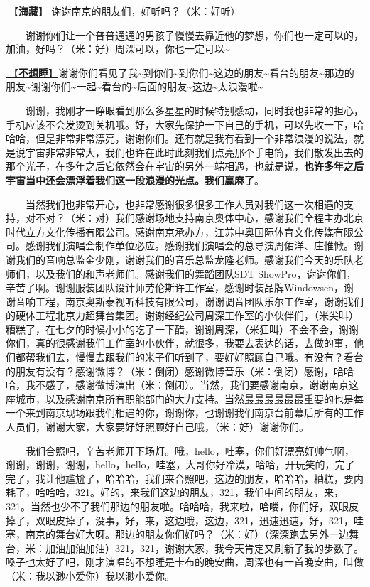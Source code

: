 \documentclass[]{ctexbook}
\begin{document}
\hyperref[ocean-treasure]{🎵【\textbf{海藏}】} 谢谢南京的朋友们，好听吗？（米：好听）

  谢谢你们让一个普普通通的男孩子慢慢去靠近他的梦想，你们也一定可以的，加油，好吗？（米：好）周深可以，你也一定可以\textasciitilde{}

\hyperref[keep-playing]{🎵【\textbf{不想睡}】}谢谢你们看见了我\textasciitilde 到你们\textasciitilde 到你们\textasciitilde 这边的朋友\textasciitilde 看台的朋友\textasciitilde 那边的朋友\textasciitilde 谢谢你们\textasciitilde 一起\textasciitilde 看台的\textasciitilde 后面的朋友\textasciitilde 这边\textasciitilde 太浪漫啦\textasciitilde{}

  谢谢，我刚才一睁眼看到那么多星星的时候特别感动，同时我也非常的担心，手机应该不会发烫到关机哦。好，大家先保护一下自己的手机，可以先收一下，哈哈哈，但是非常非常漂亮，谢谢你们。还有就是我有看到一个非常浪漫的说法，就是说宇宙非常非常大，我们也许在此时此刻我们点亮那个手电筒，我们散发出去的那个光子，在多年之后它依然会在宇宙的另外一端相遇，也就是说，\textbf{也许多年之后宇宙当中还会漂浮着我们这一段浪漫的光点。我们赢麻了}。

  当然我们也非常开心，也非常感谢很多很多工作人员对我们这一次相遇的支持，对不对？（米：对）我们感谢场地支持南京奥体中心，感谢我们全程主办北京时代立方文化传播有限公司。感谢南京承办方，江苏中奥国际体育文化传媒有限公司。感谢我们演唱会制作单位必应。感谢我们演唱会的总导演周佑洋、庄惟惞。谢谢我们的音响总监金少刚，谢谢我们的音乐总监龙隆老师。感谢我们今天的乐队老师们，以及我们的和声老师们。感谢我们的舞蹈团队SDT ShowPro，谢谢你们，辛苦了啊。谢谢服装团队设计师劳伦斯许工作室，感谢时装品牌Windowsen，谢谢音响工程，南京奥斯泰视听科技有限公司，谢谢调音团队乐尔工作室，谢谢我们的硬体工程北京力超舞台集团。谢谢经纪公司周深工作室的小伙伴们，（米尖叫）糟糕了，在七夕的时候小小的吃了一下醋，谢谢周深，（米狂叫）不会不会，谢谢你们，真的很感谢我们工作室的小伙伴，就很多，我要去表达的话，去做的事，他们都帮我们去，慢慢去跟我们的米子们听到了，要好好照顾自己哦。有没有？看台的朋友有没有？感谢微博？（米：倒闭）感谢微博音乐（米：倒闭）感谢，哈哈哈，我不感了，感谢微博演出（米：倒闭）。当然，我们要感谢南京，谢谢南京这座城市，以及感谢南京所有职能部门的大力支持。当然最最最最最最重要的也是每一个来到南京现场跟我们相遇的你，谢谢你，也谢谢我们南京台前幕后所有的工作人员们，谢谢大家，大家要好好照顾好自己哦，（米：好）谢谢你们。

  我们合照吧，辛苦老师开下场灯。哦，hello，哇塞，你们好漂亮好帅气啊，谢谢，谢谢，谢谢，hello，hello，哇塞，大哥你好冷漠，哈哈，开玩笑的，完了完了，我让他尴尬了，哈哈哈，我们来合照吧，这边的朋友，哈哈哈，糟糕，要内耗了，哈哈哈，321。好的，来我们这边的朋友，321，我们中间的朋友，来，321。当然也少不了我们那边的朋友啦。哈哈哈，我来啦，哈喽，你们好，双眼皮掉了，双眼皮掉了，没事，好，来，这边哦，这边，321，迅速迅速，好，321，哇塞，南京的舞台好大呀。那边的朋友你们好吗？（米：好）（深深跑去另外一边舞台，米：加油加油加油）321，321，谢谢大家，我今天肯定又刷新了我的步数了。嗓子也太好了吧，刚才演唱的不想睡是卡布的晚安曲，周深也有一首晚安曲，叫做（米：我以渺小爱你）我以渺小爱你。
\end{document}
